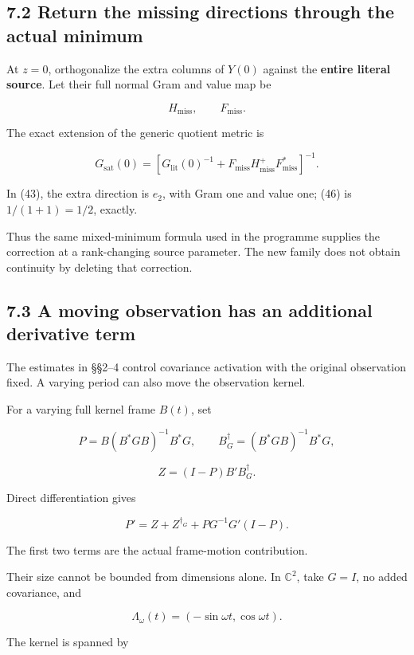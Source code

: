 \documentclass[11pt]{article}
\begin{document}
\subsection{7.2 Return the missing directions through the actual minimum}\label{return-the-missing-directions-through-the-actual-minimum}

At \(z=0\), orthogonalize the extra columns of \(Y(0)\) against the \textbf{entire literal source}. Let their full normal Gram and value map be

\[
H_{\mathrm{miss}},\qquad F_{\mathrm{miss}}.
\]

The exact extension of the generic quotient metric is

\[
\boxed{
G_{\mathrm{sat}}(0)
=
\left[
G_{\mathrm{lit}}(0)^{-1}
+
F_{\mathrm{miss}}H_{\mathrm{miss}}^+
F_{\mathrm{miss}}^*
\right]^{-1}.
}
\tag{46}
\]

In (43), the extra direction is \(e_2\), with Gram one and value one; (46) is \(1/(1+1)=1/2\), exactly.

Thus the same mixed-minimum formula used in the programme supplies the correction at a rank-changing source parameter. The new family does not obtain continuity by deleting that correction.

\subsection{7.3 A moving observation has an additional derivative term}\label{a-moving-observation-has-an-additional-derivative-term}

The estimates in §§2--4 control covariance activation with the original observation fixed. A varying period can also move the observation kernel.

For a varying full kernel frame \(B(t)\), set

\[
P=B(B^*GB)^{-1}B^*G,\qquad
B_G^\dagger=(B^*GB)^{-1}B^*G,
\]

\[
Z=(I-P)B'B_G^\dagger.
\]

Direct differentiation gives

\[
\boxed{
P'
=
Z+Z^{\dagger_G}
+PG^{-1}G'(I-P).
}
\tag{47}
\]

The first two terms are the actual frame-motion contribution.

Their size cannot be bounded from dimensions alone. In \(\mathbb C^2\), take \(G=I\), no added covariance, and

\[
\Lambda_\omega(t)=(-\sin\omega t,\cos\omega t).
\]

The kernel is spanned by
\end{document}
